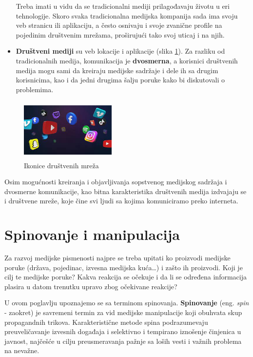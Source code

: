 \documentclass[a4paper]{article}
\begin{document}
\begin{itemize}
	
Treba imati u vidu da se tradicionalni mediji prilagođavaju životu u eri tehnologije. Skoro svaka tradicionalna medijska kompanija sada ima svoju veb stranicu ili aplikaciju, a često osnivaju i svoje zvanične profile na pojedinim društvenim mrežama, proširujući tako svoj uticaj i na njih.

	
	\item \textbf{Društveni mediji} su veb lokacije i aplikacije (slika \ref{fig:icons}). Za
	razliku od tradicionalnih medija, komunikacija je \textbf{dvosmerna}, a korisnici
	društvenih medija mogu sami da kreiraju medijske sadržaje i dele ih sa
	drugim korisnicima, kao i da jedni drugima šalju poruke kako bi
	diskutovali o problemima.
 \end{itemize}
	
	\begin{figure}[ht!]
	\begin{center}
		\includegraphics[width=1.87842in,height=1.225in]{slika4.jpg}
	\end{center}
	\caption {Ikonice društvenih mreža}
	\label{fig:icons}
	
	
\end{figure}
	
	Osim mogućnosti kreiranja i objavljivanja sopstvenog medijskog sadržaja i dvosmerne komunikacije, kao bitna karakteristika društvenih medija izdvajaju se i društvene mreže, koje čine svi ljudi sa kojima komuniciramo preko interneta. 


\section{Spinovanje i manipulacija}
\label{sec:naslov2}

Za razvoj medijske pismenosti najpre se treba upitati ko proizvodi medijske poruke (država, pojedinac, izvesna medijska kuća…) i zašto ih proizvodi. Koji je cilj te medijske poruke? Kakva reakcija se očekuje i da li se određena informacija plasira u datom trenutku upravo zbog očekivane reakcije? 

U ovom poglavlju upoznajemo se sa terminom spinovanja. \textbf{Spinovanje} (eng. \emph{spin} - zaokret) je savremeni termin za vid medijske manipulacije koji obuhvata skup propagandnih trikova. Karakteristične metode spina podrazumevaju preuveličavanje izvesnih događaja i selektivno i tempirano iznošenje činjenica u javnost, najčešće u cilju preusmeravanja pažnje sa loših vesti i važnih problema na nevažne.
\end{document}
